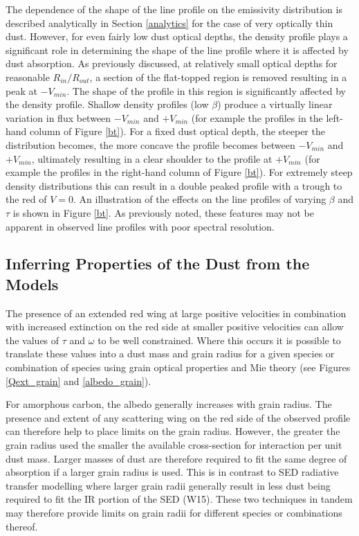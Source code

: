 The dependence of the shape of the line profile on the emissivity 
distribution is described analytically in Section \ref{analytics} for the 
case of very optically thin dust.  However, for even fairly low dust 
optical depths, the density profile plays a significant role in 
determining the shape of the line profile where it is affected by dust 
absorption.  As previously discussed, at relatively small optical depths 
for reasonable $R_{in}/R_{out}$, a section of the flat-topped region is 
removed resulting in a peak at $-V_{min}$.  The shape of the profile in 
this region is significantly affected by the density profile.  Shallow 
density profiles (low $\beta$) produce a virtually linear variation in 
flux between $-V_{min}$ and $+V_{min}$ (for example the profiles in the 
left-hand column of Figure \ref{bt}).  For a fixed dust optical depth, the 
steeper the distribution becomes, the more concave the profile becomes 
between $-V_{min}$ and $+V_{min}$, ultimately resulting in a clear 
shoulder to the profile at $+V_{min}$ (for example the profiles in the 
right-hand column of Figure \ref{bt}).  For extremely steep density 
distributions this can result in a double peaked profile with a trough to 
the red of $V=0$.  An illustration of the effects on the line profiles of 
varying $\beta$ and $\tau$ is shown in Figure \ref{bt}.  As previously 
noted, these features may not be apparent in observed line profiles with 
poor spectral resolution.

\subsection{Inferring Properties of the Dust from the Models}

The presence of an extended red wing at large positive velocities in 
combination with increased extinction on the red side at smaller positive 
velocities can allow the values of $\tau$ and $\omega$ to be well 
constrained.  Where this occurs it is possible to translate these values into a 
dust mass and grain radius for a given species or combination of 
species using grain optical properties and Mie theory (see Figures \ref{Qext_grain} and \ref{albedo_grain}).  


For amorphous carbon, the albedo generally increases with grain radius.  
The presence and extent of any scattering wing on the red side of the 
observed profile can therefore help to place limits on the grain radius.  
However, the greater the grain radius used the smaller the available 
cross-section for interaction per unit dust mass.  Larger masses of dust 
are therefore required to fit the same degree of absorption if a larger 
grain radius is used.  This is in contrast to SED radiative transfer 
modelling where larger grain radii generally result in less dust being 
required to fit the IR portion of the SED (W15).  These two techniques in 
tandem may therefore provide limits on grain radii for different species 
or combinations thereof.

